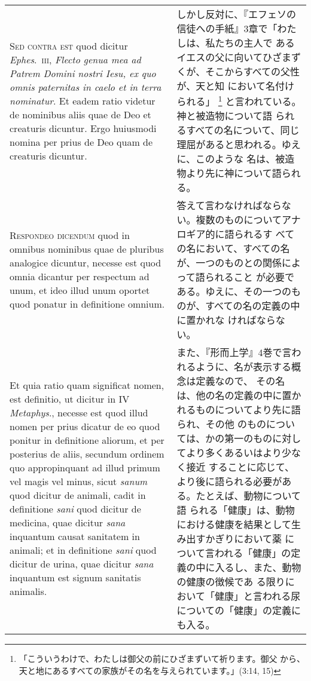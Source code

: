 \documentclass[10pt]{jsarticle} %
\begin{document}
\begin{longtable}{p{21em}p{21em}}
\\

{\scshape Sed contra est} quod dicitur {\itshape Ephes}.~{\scshape iii},
 {\itshape Flecto genua mea ad Patrem Domini nostri Iesu, ex quo omnis
 paternitas in caelo et in terra nominatur}. Et eadem ratio videtur de
 nominibus aliis quae de Deo et creaturis dicuntur. Ergo huiusmodi
 nomina per prius de Deo quam de creaturis dicuntur.

&

しかし反対に、『エフェソの信徒への手紙』3章で「わたしは、私たちの主人で
 あるイエスの父に向いてひざまずくが、そこからすべての父性が、天と知
 において名付けられる」
\footnote{「こういうわけで、わたしは御父の前にひざまずいて祈ります。御父
 から、天と地にあるすべての家族がその名を与えられています。」(3:14, 15)
}
と言われている。神と被造物について語
 られるすべての名について、同じ理屈があると思われる。ゆえに、このような
 名は、被造物より先に神について語られる。

\\


{\scshape Respondeo dicendum} quod in omnibus nominibus quae de
pluribus analogice dicuntur, necesse est quod omnia dicantur per
respectum ad unum, et ideo illud unum oportet quod ponatur in
definitione omnium. 

&

答えて言わなければならない。複数のものについてアナロギア的に語られるす
べての名において、すべての名が、一つのものとの関係によって語られること
が必要である。ゆえに、その一つのものが、すべての名の定義の中に置かれな
ければならない。

\\


Et quia ratio quam significat nomen, est
definitio, ut dicitur in IV {\itshape Metaphys}., necesse est quod
illud nomen per prius dicatur de eo quod ponitur in definitione
aliorum, et per posterius de aliis, secundum ordinem quo appropinquant
ad illud primum vel magis vel minus, sicut {\itshape sanum} quod
dicitur de animali, cadit in definitione {\itshape sani} quod dicitur
de medicina, quae dicitur {\itshape sana} inquantum causat sanitatem
in animali; et in definitione {\itshape sani} quod dicitur de urina,
quae dicitur {\itshape sana} inquantum est signum sanitatis animalis.


&

また、『形而上学』4巻で言われるように、名が表示する概念は定義なので、
その名は、他の名の定義の中に置かれるものについてより先に語られ、その他
のものについては、かの第一のものに対してより多くあるいはより少なく接近
することに応じて、より後に語られる必要がある。たとえば、動物について語
られる「健康」は、動物における健康を結果として生み出すかぎりにおいて薬
について言われる「健康」の定義の中に入るし、また、動物の健康の徴候であ
る限りにおいて「健康」と言われる尿についての「健康」の定義にも入る。


\end{longtable}
\end{document}
